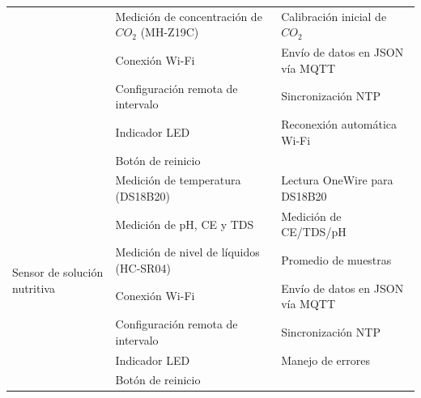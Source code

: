 \begin{table}[H]
\begin{tabular}{p{1.5cm}p{5.4cm}p{5.5cm}}
                                                          & Medición de concentración de $CO_2$ (MH-Z19C)                                 & Calibración inicial de $CO_2$                  \\
                                                          & Conexión Wi-Fi                                                                & Envío de datos en JSON vía MQTT                \\
                                                          & Configuración remota de intervalo                                             & Sincronización NTP                             \\
                                                          & Indicador LED                                                                 & Reconexión automática Wi-Fi                    \\
                                                          & Botón de reinicio                                                             &                                                \\
        \hline
        \multirow{7}{1.5cm}{Sensor de solución nutritiva} & Medición de temperatura (DS18B20)                                             & Lectura OneWire para DS18B20                   \\
                                                          & Medición de pH, CE y TDS                                                      & Medición de CE/TDS/pH                          \\
                                                          & Medición de nivel de líquidos (HC-SR04)                                       & Promedio de muestras                           \\
                                                          & Conexión Wi-Fi                                                                & Envío de datos en JSON vía MQTT                \\
                                                          & Configuración remota de intervalo                                             & Sincronización NTP                             \\
                                                          & Indicador LED                                                                 & Manejo de errores                              \\
                                                          & Botón de reinicio                                                             &                                                \\

\end{tabular}
\end{table}
